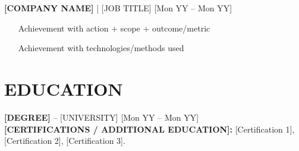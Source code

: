 \documentclass[9pt, letterpaper]{article}
\begin{document}
	\noindent \textbf{[COMPANY NAME]} | [JOB TITLE] \hfill [Mon YY -- Mon YY]
	\begin{itemize}[noitemsep, topsep=1pt, leftmargin=1.5em]
		\item [Achievement with action + scope + outcome/metric]
		\item [Achievement with technologies/methods used]
	\end{itemize}

	\section*{EDUCATION}
	\noindent \textbf{[DEGREE]} -- [UNIVERSITY] \hfill [Mon YY -- Mon YY] \\
	\noindent \textbf{[CERTIFICATIONS / ADDITIONAL EDUCATION]:} [Certification 1], [Certification 2], [Certification 3].
\end{document}
